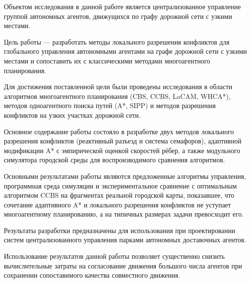 \abstract


Объектом исследования в данной работе является централизованное
управление группой автономных агентов, движущихся по графу
дорожной сети с узкими местами.

Цель работы --- разработать методы локального разрешения
конфликтов для глобального управления автономными агентами 
на графе дорожной сети с узкими местами и сопоставить их с классическими
методами многоагентного планирования.

Для достижения поставленной цели были проведены исследования в области
алгоритмов многоагентного планирования (CBS, CCBS, LaCAM, WHCA*), методов
одноагентного поиска путей (A*, SIPP) и методов разрешения конфликтов на
узких участках дорожной сети.

Основное содержание работы состояло в разработке двух методов локального
разрешения конфликтов (реактивный разъезд и система семафоров), адаптивной
модификации A* с эмпирической оценкой скоростей рёбер, а также модульного
симулятора городской среды для воспроизводимого сравнения алгоритмов.

Основными результатами работы являются предложенные алгоритмы управления,
программная среда симуляции и экспериментальное сравнение с оптимальным
алгоритмом CCBS на фрагментах реальной городской карты, показавшее, что
сочетание адаптивного A* и локального разрешения конфликтов не уступает
многоагентному планированию, а на типичных размерах задачи превосходит его.

Результаты разработки предназначены для использования при проектировании
систем централизованного управления парками автономных доставочных агентов.

Использование результатов данной работы позволяет существенно снизить
вычислительные затраты на согласование движения большого числа агентов при
сохранении сопоставимого качества совместного движения.
